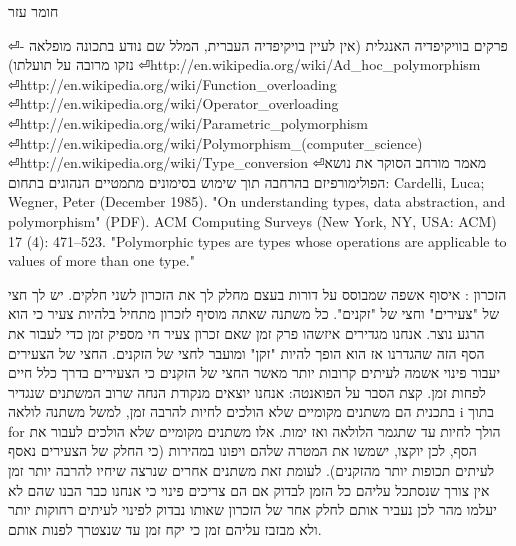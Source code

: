 \begin{טבלא}[!htbp]
        חומר עזר

⏎פרקים בוויקיפדיה האנגלית (אין לעיין בויקיפדיה העברית, המלל שם נודע בתכונה מופלאה - נזקו מרובה על תועלתו)
⏎http://en.wikipedia.org/wiki/Ad\_hoc\_polymorphism
⏎http://en.wikipedia.org/wiki/Function\_overloading
⏎http://en.wikipedia.org/wiki/Operator\_overloading
⏎http://en.wikipedia.org/wiki/Parametric\_polymorphism
⏎http://en.wikipedia.org/wiki/Polymorphism\_(computer\_science)
⏎http://en.wikipedia.org/wiki/Type\_conversion
⏎מאמר מורחב הסוקר את נושא הפולימורפיזם בהרחבה תוך שימוש בסימונים מתמטיים הנהוגים בתחום:
        Cardelli, Luca; Wegner, Peter (December 1985). "On understanding types, data abstraction, and polymorphism" (PDF). ACM Computing Surveys (New York, NY, USA: ACM) 17 (4): 471–523. "Polymorphic types are types whose operations are applicable to values of more than one type."

        הזכרון
        :
        איסוף אשפה שמבוסס על דורות בעצם מחלק לך את הזכרון לשני חלקים. יש לך חצי של
        "צעירים" וחצי של "זקנים". כל משתנה שאתה מוסיף לזכרון מתחיל בלהיות צעיר כי הוא
        הרגע נוצר. אנחנו מגדירים איזשהו פרק זמן שאם זכרון צעיר חי מספיק זמן כדי לעבור
        את הסף הזה שהגדרנו אז הוא הופך להיות "זקן" ומועבר לחצי של הזקנים. החצי של
        הצעירים יעבור פינוי אשמה לעיתים קרובות יותר מאשר החצי של הזקנים כי הצעירים בדרך
        כלל חיים לפחות זמן. קצת הסבר על הפואנטה: אנחנו יוצאים מנקודת הנחה שרוב המשתנים
        שנגדיר בתכנית הם משתנים מקומיים שלא הולכים לחיות להרבה זמן, למשל משתנה לולאה i
        בתוך for הולך לחיות עד שתגמר הלולאה ואז ימות. אלו משתנים מקומיים שלא הולכים
        לעבור את הסף, לכן יוקצו, ישמשו את המטרה שלהם ויפונו במהירות (כי החלק של הצעירים
        נאסף לעיתים תכופות יותר מהזקנים). לעומת זאת משתנים אחרים שנרצה שיחיו להרבה
        יותר זמן אין צורך שנסתכל עליהם כל הזמן לבדוק אם הם צריכים פינוי כי אנחנו כבר
        הבנו שהם לא יעלמו מהר לכן נעביר אותם לחלק אחר של הזכרון שאותו נבדוק לפינוי
        לעיתים רחוקות יותר ולא מבזבז עליהם זמן כי יקח זמן עד שנצטרך לפנות אותם.


\end{טבלא}
